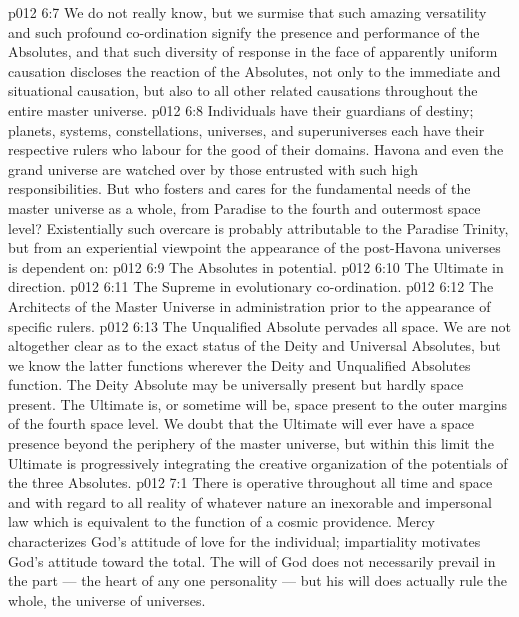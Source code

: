\vs p012 6:7 We do not really know, but we surmise that such amazing versatility and such profound co\hyp{}ordination signify the presence and performance of the Absolutes, and that such diversity of response in the face of apparently uniform causation discloses the reaction of the Absolutes, not only to the immediate and situational causation, but also to all other related causations throughout the entire master universe.
\vs p012 6:8 \pc Individuals have their guardians of destiny; planets, systems, constellations, universes, and superuniverses each have their respective rulers who labour for the good of their domains. Havona and even the grand universe are watched over by those entrusted with such high responsibilities. But who fosters and cares for the fundamental needs of the master universe as a whole, from Paradise to the fourth and outermost space level? Existentially such overcare is probably attributable to the Paradise Trinity, but from an experiential viewpoint the appearance of the post\hyp{}Havona universes is dependent on:
\vs p012 6:9 \bibnobreakspace The Absolutes in potential.
\vs p012 6:10 \bibnobreakspace The Ultimate in direction.
\vs p012 6:11 \bibnobreakspace The Supreme in evolutionary co\hyp{}ordination.
\vs p012 6:12 \bibnobreakspace The Architects of the Master Universe in administration prior to the appearance of specific rulers.
\vs p012 6:13 \pc The Unqualified Absolute pervades all space. We are not altogether clear as to the exact status of the Deity and Universal Absolutes, but we know the latter functions wherever the Deity and Unqualified Absolutes function. The Deity Absolute may be universally present but hardly space present. The Ultimate is, or sometime will be, space present to the outer margins of the fourth space level. We doubt that the Ultimate will ever have a space presence beyond the periphery of the master universe, but within this limit the Ultimate is progressively integrating the creative organization of the potentials of the three Absolutes.
\vs p012 7:1 There is operative throughout all time and space and with regard to all reality of whatever nature an inexorable and impersonal law which is equivalent to the function of a cosmic providence. Mercy characterizes God’s attitude of love for the individual; impartiality motivates God’s attitude toward the total. The will of God does not necessarily prevail in the part --- the heart of any one personality --- but his will does actually rule the whole, the universe of universes.
